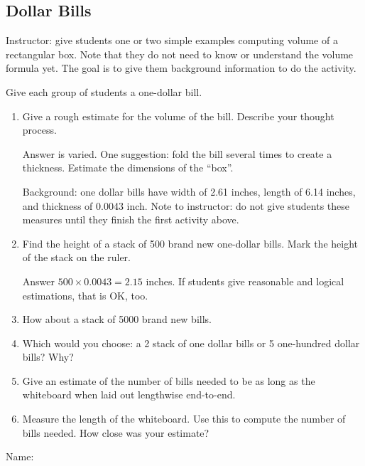 \documentclass{article}
\begin{document}
\subsection*{Dollar Bills}

\begin{notes}Instructor: give students one or two simple examples computing volume of a rectangular
box. Note that they do not need to know or understand the volume formula yet. The goal
is to give them background information to do the activity.

Give each group of students a one-dollar bill. \end{notes}
\begin{enumerate}
\item  Give a rough estimate for the volume of the bill. Describe your thought process.
\begin{notes}
  Answer is varied. One suggestion: fold the bill several times to create a thickness.
Estimate the dimensions of the ``box''.
\end{notes}
\student{\vspace{1in}}
\begin{notes}
  Background: one dollar bills have width of 2.61 inches, length of 6.14 inches, and thickness
of 0.0043 inch. Note to instructor: do not give students these measures until they finish
the first activity above.
\end{notes}
\item{}

  Find the height of a stack of 500 brand new one-dollar bills. Mark the height of the stack on the ruler.
  \begin{notes}
    Answer \(500 \times 0.0043 = 2.15\) inches. If students give reasonable and logical estimations, that is OK, too.
  \end{notes}
  \student{\vspace{1in}}
\item How about a stack of 5000 brand new bills.
\item Which would you choose: a \SI{2}{\in} stack of one dollar bills or 5 one-hundred dollar bills? Why?
\item Give an estimate of the number of bills needed to be as long as the whiteboard when laid out lengthwise end-to-end.
\item Measure the length of the whiteboard. Use this to compute the number of bills needed. How close was your estimate?
\end{enumerate}
\clearpage
\hfill Name:\underline{\hspace{1.5in}}
\end{document}
